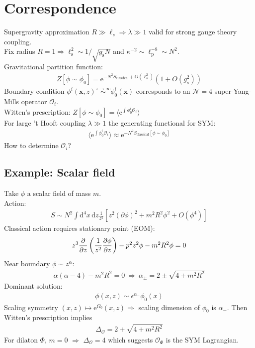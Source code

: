 \documentclass[12pt]{article}
\begin{document}
\section{Correspondence}
Supergravity approximation $R\gg\ell_s \Rightarrow \lambda \gg 1$ valid for strong gauge theory coupling.\\
Fix radius $R=1 \Rightarrow \ell_\mathrm s^2\sim 1/\sqrt{g_\mathrm s N}$ and $\kappa^{-2}\sim \ell_\mathrm p^{-8}\sim N^{2}$.\\
Gravitational partition function:
\begin{eqnarray}
Z[ \phi \sim \phi_0] = \mathrm e^{-N^2 S_\mathrm {classical} +O(\ell_s^2)}\left( 1+ O(g_s^2)\right)
\end{eqnarray}
Boundary condition $\phi^i(\mathbf x, z) \stackrel{z\to \infty}{\sim}  \phi^i_0(\mathbf x)$ corresponds to an $\mathcal N=4$ super-Yang-Mills operator $\mathcal O_i$.\\
Witten's prescription: $Z[ \phi \sim \phi_0]=\langle \mathrm e^{\int \phi^i_0 \mathcal O_i}\rangle $\\
For large 't Hooft coupling $\lambda \gg 1$ the generating functional for SYM:
\begin{eqnarray}
\langle \mathrm e^{\int \phi^i_0 \mathcal O_i}\rangle
\approx \mathrm e^{-N^2 S_\mathrm {classical}[\phi \sim \phi_0]}
\end{eqnarray}
How to determine $\mathcal O_i$?

\subsection{Example: Scalar field}
Take $\phi$ a scalar field of mass $m$.\\
Action:
\begin{eqnarray}
S\sim N^2 \int \mathrm d^4 x \, \mathrm d z \frac1{z^5} \left[ z^2 (\partial \phi)^2 + m^2 R^2 \phi^2+O(\phi^4)\right] 
\end{eqnarray}
Classical action requires stationary point (EOM):
\begin{eqnarray}
z^3 {\partial\over \partial z} \left( \frac1{z^2} {\partial\phi\over \partial z}\right)-p^2 z^2 \phi - m^2 R^2 \phi= 0
\end{eqnarray}
Near boundary $\phi \sim z^\alpha$:
\begin{eqnarray}
\alpha(\alpha -4) -m^2 R^2=0~\Rightarrow~ \alpha_\pm= 2\pm\sqrt {4+m^2R^2}
\end{eqnarray}
Dominant solution:
\begin{eqnarray}
\phi(x, z) \sim \epsilon^{\alpha_-} \phi_0(x)
\end{eqnarray}
Scaling symmetry $(x, z)\mapsto \mathrm e^{\Omega_0}(x,z) \Rightarrow $ scaling dimension of $\phi_0$ is $\alpha_-$. Then Witten's prescription implies 
\begin{eqnarray}
\Delta_\mathcal O = 2+\sqrt{4+m^2 R^2}
\end{eqnarray}
For dilaton $\Phi$, $m=0$ $\Rightarrow$ $\Delta_\mathcal O = 4$ which suggests $\mathcal O_\Phi$ is the SYM Lagrangian.
\end{document}
